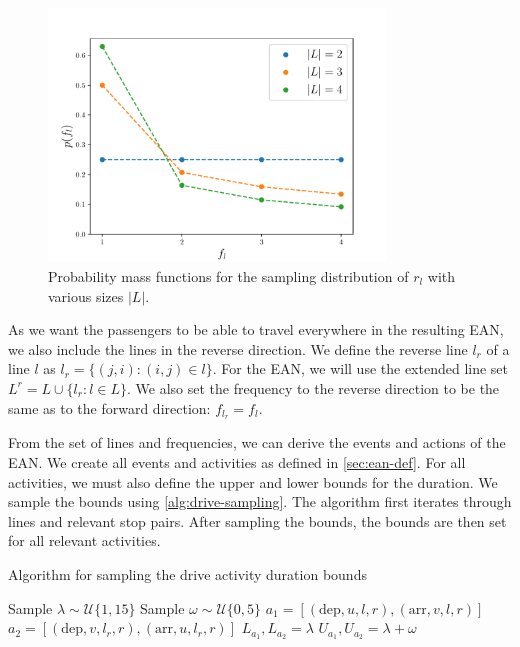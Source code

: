 \documentclass[english, 12pt, a4paper, sci, utf8, a-2b, online]{aaltothesis}
\newcommand{\unif}[1]{\mathcal{U}\{#1\}}
\begin{document}
\begin{figure}
    \centering
    \includegraphics[width=0.8\textwidth]{figures/generation-rl-sample-density.pdf}
    \caption{Probability mass functions for the sampling distribution of $r_l$ with various sizes $|L|$.}
    \label{fig:generation-rl-mass}
\end{figure}


As we want the passengers to be able to travel everywhere in the resulting EAN, we also include the lines in the reverse direction. We define the reverse line $l_r$ of a line $l$ as $l_r = \{(j, i):(i, j) \in l\}$. For the EAN, we will use the extended line set $L^r = L \cup \{l_r : l \in L \}$. We also set the frequency to the reverse direction to be the same as to the forward direction: $f_{l_r} = f_l$.

From the set of lines and frequencies, we can derive the events and actions of the EAN. We create all events and activities as defined in \cref{sec:ean-def}. For all activities, we must also define the upper and lower bounds for the duration. We sample the bounds using \cref{alg:drive-sampling}. The algorithm first iterates through lines and relevant stop pairs. After sampling the bounds, the bounds are then set for all relevant activities.


\begin{algorithm}

\caption{Algorithm for sampling the drive activity duration bounds}
\label{alg:drive-sampling}
\begin{algorithmic}
            \State Sample $\lambda \sim \unif{1, 15}$ 
            \State Sample $\omega \sim \unif{0, 5}$ 
                \State $a_1 = [(\text{dep}, u, l, r), (\text{arr}, v, l, r)]$ 
                \State $a_2 = [(\text{dep}, v, l_r, r), (\text{arr}, u, l_r, r)]$ 
                \State $L_{a_1}, L_{a_2} = \lambda$
                \State $U_{a_1}, U_{a_2} = \lambda + \omega$
            \EndFor
        \EndFor
    \EndFor
\end{algorithmic}

\end{algorithm}
\end{document}
